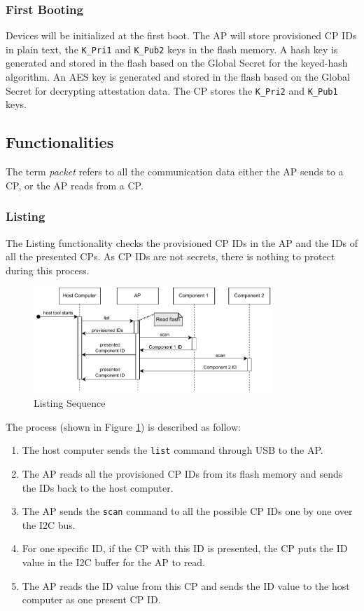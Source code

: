 \documentclass[11pt,oneside,onecolumn,letterpaper]{article}
\newcounter{alg}
\begin{document}
	\subsubsection{First Booting}
	Devices will be initialized at the first boot.
	The AP will store provisioned CP IDs in plain text,
	the \texttt{K\_Pri1} and \texttt{K\_Pub2} keys in the flash memory.
	A hash key is generated and stored in the flash based on the Global Secret for the keyed-hash algorithm.
	An AES key is generated and stored in the flash based on the Global Secret for decrypting attestation data.
	The CP stores the \texttt{K\_Pri2} and \texttt{K\_Pub1} keys.
	
	\subsection{Functionalities}
	The term \textit{packet} refers to all the communication data either the AP sends to a CP,
	or the AP reads from a CP.
	
	\subsubsection{Listing}
	The Listing functionality checks the provisioned CP IDs in the AP and the IDs of all the presented CPs.
	As CP IDs are not secrets,
	there is nothing to protect during this process.
	
	\begin{figure}[h]
		\centering
		\includegraphics[width=0.8\textwidth]{pics/list.pdf}
		\caption{Listing Sequence}
		\label{fig:functionality_list}
	\end{figure}
	
	The process (shown in Figure \ref{fig:functionality_list}) is described as follow:
	
	\begin{enumerate}
		\item The host computer sends the \texttt{list} command through USB to the AP.
		\item The AP reads all the provisioned CP IDs from its flash memory and sends the IDs back to the host computer.
		\item The AP sends the \texttt{scan} command to all the possible CP IDs one by one over the I2C bus.
		\item For one specific ID,
		if the CP with this ID is presented,
		the CP puts the ID value in the I2C buffer for the AP to read.
		\item The AP reads the ID value from this CP and sends the ID value to the host computer as one present CP ID.
		
	\end{enumerate}
	
\end{document}
